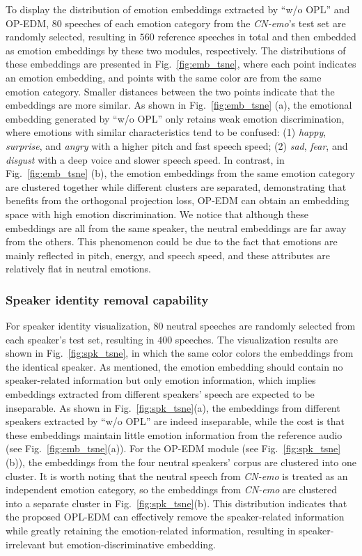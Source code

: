 \documentclass[journal,comsoc]{IEEEtran}
\begin{document}
To display the distribution of emotion embeddings extracted by ``w/o OPL'' and OP-EDM, $80$ speeches of each emotion category from the \textit{CN-emo}'s test set are randomly selected, resulting in $560$ reference speeches in total and then embedded as emotion embeddings by these two modules, respectively.
The distributions of these embeddings are presented in Fig.~\ref{fig:emb_tsne}, where each point indicates an emotion embedding, and points with the same color are from the same emotion category. 
Smaller distances between the two points indicate that the embeddings are more similar.
As shown in Fig.~\ref{fig:emb_tsne} (a), the emotional embedding generated by ``w/o OPL'' only retains weak emotion discrimination, where emotions with similar characteristics tend to be confused: (1) \textit{happy}, \textit{surprise}, and \textit{angry} with a higher pitch and fast speech speed; (2) \textit{sad}, \textit{fear}, and \textit{disgust} with a deep voice and slower speech speed.
In contrast, in Fig.~\ref{fig:emb_tsne} (b), the emotion embeddings from the same emotion category are clustered together while different clusters are separated, demonstrating that benefits from the orthogonal projection loss, OP-EDM can obtain an embedding space with high emotion discrimination. 
We notice that although these embeddings are all from the same speaker, the neutral embeddings are far away from the others. This phenomenon could be due to the fact that emotions are mainly reflected in pitch, energy, and speech speed, and these attributes are relatively flat in neutral emotions.

\subsubsection{Speaker identity removal capability}
For speaker identity visualization, $80$ neutral speeches are randomly selected from each speaker's test set, resulting in $400$ speeches. 
The visualization results are shown in Fig.~\ref{fig:spk_tsne}, in which the same color colors the embeddings from the identical speaker.
As mentioned, the emotion embedding should contain no speaker-related information but only emotion information, which implies embeddings extracted from different speakers' speech are expected to be inseparable.
As shown in Fig.~\ref{fig:spk_tsne}(a), the embeddings from different speakers extracted by ``w/o OPL'' are indeed inseparable, while the cost is that these embeddings maintain little emotion information from the reference audio (see Fig.~\ref{fig:emb_tsne}(a)).
For the OP-EDM module (see Fig.~\ref{fig:spk_tsne}(b)), the embeddings from the four neutral speakers' corpus are clustered into one cluster. 
It is worth noting that the neutral speech from \textit{CN-emo} is treated as an independent emotion category, so the embeddings from \textit{CN-emo} are clustered into a separate cluster in Fig.~\ref{fig:spk_tsne}(b).
This distribution indicates that the proposed OPL-EDM can effectively remove the speaker-related information while greatly retaining the emotion-related information, resulting in speaker-irrelevant but emotion-discriminative embedding. 
\end{document}
